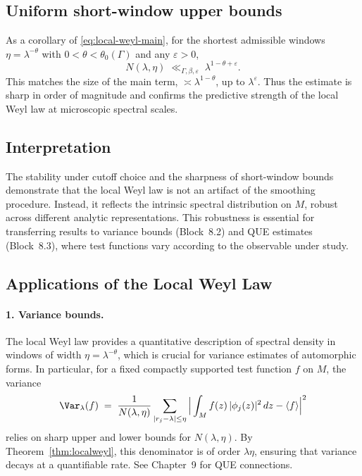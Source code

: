 \subsection{Uniform short-window upper bounds}

As a corollary of \eqref{eq:local-weyl-main}, for the shortest admissible windows $\eta=\lambda^{-\theta}$ with $0<\theta<\theta_0(\Gamma)$ and any $\varepsilon>0$,
\[
N(\lambda,\eta)\;\ll_{\Gamma,\beta,\varepsilon}\; \lambda^{1-\theta+\varepsilon}.
\]
This matches the size of the main term, $\asymp \lambda^{1-\theta}$, up to $\lambda^\varepsilon$.  
Thus the estimate is sharp in order of magnitude and confirms the predictive strength of the local Weyl law at microscopic spectral scales.

\subsection{Interpretation}

The stability under cutoff choice and the sharpness of short-window bounds demonstrate that the local Weyl law is not an artifact of the smoothing procedure.  
Instead, it reflects the intrinsic spectral distribution on $M$, robust across different analytic representations.  
This robustness is essential for transferring results to variance bounds (Block~8.2) and QUE estimates (Block~8.3), where test functions vary according to the observable under study.


\subsection{Applications of the Local Weyl Law}

\paragraph{1. Variance bounds.}
The local Weyl law provides a quantitative description of spectral density in windows of width $\eta=\lambda^{-\theta}$, which is crucial for variance estimates of automorphic forms.  
In particular, for a fixed compactly supported test function $f$ on $M$, the variance
\[
\Var_\lambda(f) \;=\; \frac{1}{N(\lambda,\eta)} \sum_{|r_j-\lambda|\leq \eta} \Big|\int_M f(z)\,|\phi_j(z)|^2\,dz - \langle f \rangle \Big|^2
\]
relies on sharp upper and lower bounds for $N(\lambda,\eta)$.  
By Theorem~\ref{thm:localweyl}, this denominator is of order $\lambda \eta$, ensuring that variance decays at a quantifiable rate.  
See Chapter~9 for QUE connections.

